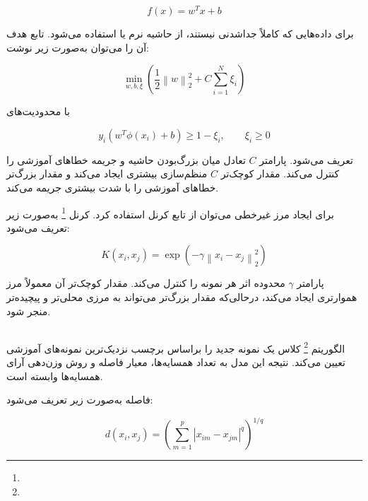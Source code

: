 \begin{equation}
f(x)
=
w^Tx+b
\end{equation}

برای داده‌هایی که کاملاً جداشدنی نیستند، از حاشیه نرم یا
استفاده می‌شود. تابع هدف آن را می‌توان به‌صورت زیر نوشت:

\begin{equation}
\min_{w,b,\xi}
\left(
\frac{1}{2}\left\|w\right\|_2^2
+
C\sum_{i=1}^{N}\xi_i
\right)
\end{equation}

با محدودیت‌های

\begin{equation}
y_i\left(w^T\phi(x_i)+b\right)
\geq
1-\xi_i,
\qquad
\xi_i\geq0
\end{equation}

تعریف می‌شود. پارامتر $C$ تعادل میان بزرگ‌بودن حاشیه و جریمه خطاهای آموزشی را کنترل می‌کند. مقدار کوچک‌تر $C$ منظم‌سازی بیشتری ایجاد می‌کند و مقدار بزرگ‌تر خطاهای آموزشی را با شدت بیشتری جریمه می‌کند.

برای ایجاد مرز غیرخطی می‌توان از تابع کرنل استفاده کرد. کرنل
\footnote{}
به‌صورت زیر تعریف می‌شود:

\begin{equation}
K(x_i,x_j)
=
\exp
\left(
-\gamma
\left\|x_i-x_j\right\|_2^2
\right)
\end{equation}

پارامتر $\gamma$ محدوده اثر هر نمونه را کنترل می‌کند. مقدار کوچک‌تر آن معمولاً مرز هموارتری ایجاد می‌کند، درحالی‌که مقدار بزرگ‌تر می‌تواند به مرزی محلی‌تر و پیچیده‌تر منجر شود.


\subsection{}

الگوریتم
\footnote{}
کلاس یک نمونه جدید را براساس برچسب نزدیک‌ترین نمونه‌های آموزشی تعیین می‌کند. نتیجه این مدل به تعداد همسایه‌ها، معیار فاصله و روش وزن‌دهی آرای همسایه‌ها وابسته است.

فاصله
به‌صورت زیر تعریف می‌شود:

\begin{equation}
d(x_i,x_j)
=
\left(
\sum_{m=1}^{p}
|x_{im}-x_{jm}|^q
\right)^{1/q}
\end{equation}

